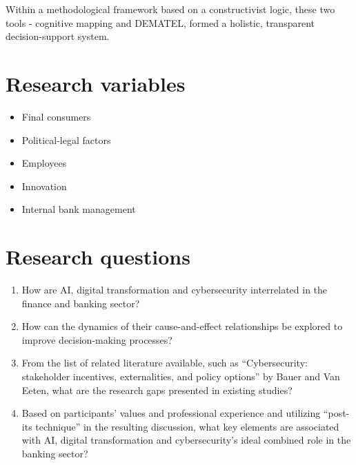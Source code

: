 \documentclass{article}
\begin{document}
Within a methodological framework based on a constructivist logic, these two tools - cognitive mapping and DEMATEL, formed a holistic, transparent decision-support system. \cite{rodrigues2022artificial}

\section*{Research variables}
\begin{itemize}
  \item Final consumers
  \item Political-legal factors
  \item Employees
  \item Innovation
  \item Internal bank management
\end{itemize}
\section*{Research questions}
\begin{enumerate}
  \item How are AI, digital transformation and cybersecurity interrelated in the finance and banking sector? 
  \item How can the dynamics of their cause-and-effect relationships be explored to improve decision-making processes? \cite{rodrigues2022artificial}
  \item From the list of related literature available, such as “Cybersecurity: stakeholder incentives, externalities, and policy options” by Bauer and Van Eeten, what are the research gaps presented in existing studies? \cite{bauer2009cybersecurity}
  \item Based on participants’ values and professional experience and utilizing “post-its technique'' \cite{eden2004cognitive} in the resulting discussion, what key elements are associated with AI, digital transformation and cybersecurity’s ideal combined role in the banking sector? \cite{rodrigues2022artificial}
\end{enumerate}




\end{document}

